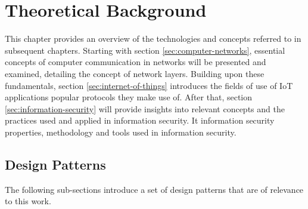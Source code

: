 \chapter{Theoretical Background}
\label{chap:theoretical-background}
This chapter provides an overview of the technologies and concepts referred to in subsequent chapters.
Starting with section \ref{sec:computer-networks}, essential concepts of computer communication in networks will be presented and examined, detailing the concept of network layers.
Building upon these fundamentals, section \ref{sec:internet-of-things} introduces the fields of use of \ac{IoT} applications popular protocols they make use of.
After that, section \ref{sec:information-security} will provide insights into relevant concepts and the practices used and applied in information security. It information security properties, methodology and tools used in information security.


\section{Design Patterns}
The following sub-sections introduce a set of design patterns that are of relevance to this work.


